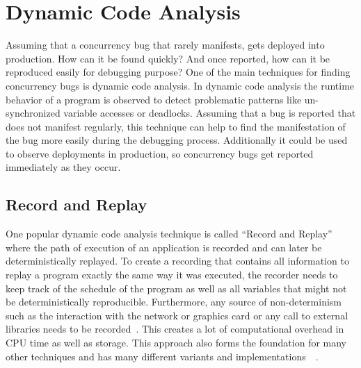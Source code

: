 \documentclass[conference]{IEEEtran}
\begin{document}
\section{Dynamic Code Analysis}
\label{sct:dynamic}

Assuming that a concurrency bug that rarely manifests, gets deployed into production.
How can it be found quickly?
And once reported, how can it be reproduced easily for debugging purpose?
One of the main techniques for finding concurrency bugs is dynamic code analysis.
In dynamic code analysis the runtime behavior of a program is observed to detect problematic patterns like un-synchronized variable accesses or deadlocks.
Assuming that a bug is reported that does not manifest regularly, this technique can help to find the manifestation of the bug more easily during the debugging process.
Additionally it could be used to observe deployments in production, so concurrency bugs get reported immediately as they occur.

\subsection{Record and Replay}
One popular dynamic code analysis technique is called ``Record and Replay'' where the path of execution of an application is recorded and can later be deterministically replayed.
To create a recording that contains all information to replay a program exactly the same way it was executed, the recorder needs to keep track of the schedule of the program as well as all variables that might not be deterministically reproducible.
Furthermore, any source of non-determinism such as the interaction with the network or graphics card or any call to external libraries needs to be recorded~\cite{lidbury2019sparse}.
This creates a lot of computational overhead in CPU time as well as storage.
This approach also forms the foundation for many other techniques and has many different variants and implementations~\cite{acm2002}~\cite{lidbury2019sparse}.
\end{document}
